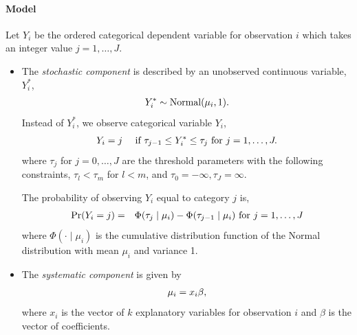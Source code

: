 \documentclass[letterpaper,10pt,english]{sphinxmanual}
\begin{document}
\paragraph{Model}
\label{zelig-oprobitbayes:model}
Let \(Y_{i}\) be the ordered categorical dependent variable for
observation \(i\) which takes an integer value
\(j=1, \ldots, J\).
\begin{itemize}
\item {} 
The \emph{stochastic component} is described by an unobserved continuous
variable, \(Y_i^*\),
\begin{gather}
\begin{split}\begin{aligned}
Y_{i}^*  \sim \textrm{Normal}(\mu_i, 1).\end{aligned}\end{split}\notag
\end{gather}
Instead of \(Y_i^*\), we observe categorical variable
\(Y_i\),
\begin{gather}
\begin{split}\begin{aligned}
Y_i = j \quad \textrm{ if } \tau_{j-1} \le Y_i^* \le \tau_j \textrm{
for } j=1,\ldots, J.\end{aligned}\end{split}\notag
\end{gather}
where \(\tau_j\) for \(j=0,\ldots, J\) are the threshold
parameters with the following constraints, \(\tau_l < \tau_m\)
for \(l < m\), and \(\tau_0=-\infty, \tau_J=\infty\).

The probability of observing \(Y_i\) equal to category \(j\)
is,
\begin{gather}
\begin{split}\begin{aligned}
\Pr(Y_i=j) &=& \Phi(\tau_j \mid \mu_i)-\Phi(\tau_{j-1} \mid \mu_i)
\textrm{ for } j=1,\ldots, J\end{aligned}\end{split}\notag
\end{gather}
where \(\Phi(\cdot \mid \mu_i)\) is the cumulative distribution
function of the Normal distribution with mean \(\mu_i\) and
variance 1.

\item {} 
The \emph{systematic component} is given by
\begin{gather}
\begin{split}\begin{aligned}
\mu_{i}= x_i \beta,\end{aligned}\end{split}\notag
\end{gather}
where \(x_{i}\) is the vector of \(k\) explanatory variables
for observation \(i\) and \(\beta\) is the vector of
coefficients.


\end{itemize}
\end{document}
